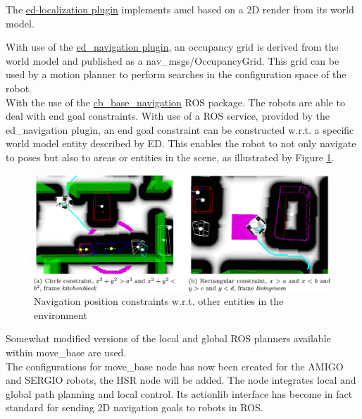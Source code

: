 The \href{{https://github.com/tue-robotics/ed_localization}}{\acrshort{ed}-localization plugin} implements \acrshort{amcl} based on a 2D render from its world model.

With use of the \href{https://github.com/tue-robotics/ed_navigation}{ed\_navigation plugin}, an occupancy grid is derived from the world model and published as a nav\_msgs/OccupancyGrid. This grid can be used by a motion planner to perform searches in the configuration space of the robot.
\\
With the use of the \href{https://github.com/tue-robotics/cb_base_navigation}{cb\_base\_navigation} ROS package. The robots are able to deal with end goal constraints. With use of a ROS service, provided by the ed\_navigation plugin, an end goal constraint can be constructed w.r.t. a specific world model entity described by ED. This enables the robot to not only navigate to poses but also to areas or entities in the scene, as illustrated by Figure \ref{fig:ed_navigation_constraints}.
\begin{figure}[h]
    \centering
    \vspace{-0.2cm}
	\includegraphics[width = 0.9\linewidth]{Figures/ed_navigation_constraints}
    \vspace{-0.5em}
	\caption{Navigation position constraints w.r.t. other entities in the environment}
	\label{fig:ed_navigation_constraints}
    \vspace{-0.5cm}
\end{figure}
Somewhat modified versions of the local and global ROS planners available within move\_base are used. \\The configurations for move\_base node has now been created for the AMIGO and SERGIO robots, the HSR node will be added. The node integrates local and global path planning and local control. Its actionlib interface has become in fact standard for sending 2D navigation goals to robots in ROS. 